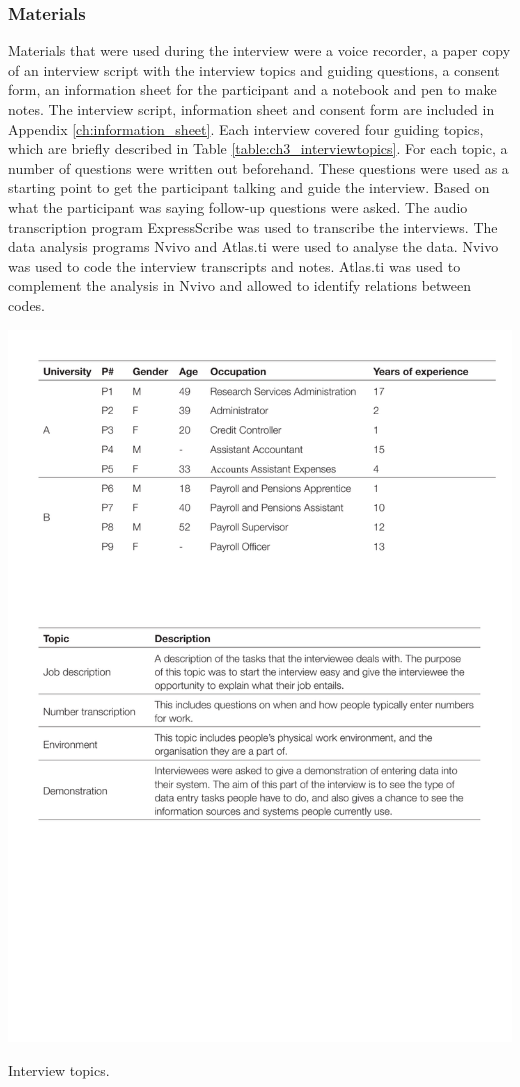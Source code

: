 \subsubsection{Materials}
Materials that were used during the interview were a voice recorder, a paper copy of an interview script with the interview topics and guiding questions, a consent form, an information sheet for the participant and a notebook and pen to make notes. The interview script, information sheet and consent form are included in Appendix \ref{ch:information_sheet}.
Each interview covered four guiding topics, which are briefly described in Table \ref{table:ch3_interviewtopics}. For each topic, a number of questions were written out beforehand. These questions were used as a starting point to get the participant talking and guide the interview. Based on what the participant was saying follow-up questions were asked. The audio transcription program ExpressScribe was used to transcribe the interviews. The data analysis programs Nvivo and Atlas.ti were used to analyse the data. Nvivo was used to code the interview transcripts and notes. Atlas.ti was used to complement the analysis in Nvivo and allowed to identify relations between codes.

\begin{table}[htp]
\centering
\includegraphics[width=\textwidth]{images/ch12/ch12-1_InterviewTopics.pdf}
    \caption[Study 1 interview topics]{Interview topics.}
    \label{table:ch3_interviewtopics}
\end{table}%

